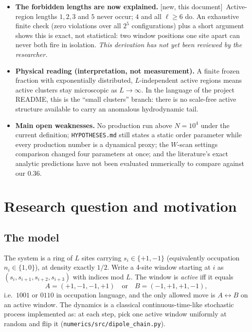 \documentclass[11pt,a4paper]{article}
\newcommand{\NEW}{\textcolor{blue!55!black}{\textsf{\small[new, this document]}}}
\begin{document}
\begin{itemize}
\item \textbf{The forbidden lengths are now explained.} \NEW\ Active-region
lengths $1,2,3$ and $5$ never occur; $4$ and all $\ell\ge6$ do. An
exhaustive finite check (zero violations over all $2^5$ configurations)
plus a short argument shows this is exact, not statistical: two window
positions one site apart can never both fire in isolation. \emph{This
derivation has not yet been reviewed by the researcher.}

\item \textbf{Physical reading (interpretation, not measurement).} A finite
frozen fraction with exponentially distributed, $L$-independent active
regions means active clusters stay microscopic as $L\to\infty$. In the
language of the project README, this is the ``small clusters'' branch:
there is no scale-free active structure available to carry an anomalous
hydrodynamic tail.

\item \textbf{Main open weaknesses.} No production run above $N=10^4$ under
the current definition; \texttt{HYPOTHESES.md} still states a static order
parameter while every production number is a dynamical proxy; the
$W$-scan settings comparison changed four parameters at once; and the
literature's exact analytic predictions have not been evaluated
numerically to compare against our $0.36$.
\end{itemize}

\tableofcontents
\newpage

\section{Research question and motivation}

\subsection{The model}
The system is a ring of $L$ sites carrying $s_i\in\{+1,-1\}$ (equivalently
occupation $n_i\in\{1,0\}$), at density exactly $1/2$. Write a 4-site window
starting at $i$ as $(s_i,s_{i+1},s_{i+2},s_{i+3})$ with indices mod $L$. The
window is \emph{active} iff it equals
\begin{equation}
A=(+1,-1,-1,+1) \quad\text{or}\quad B=(-1,+1,+1,-1),
\end{equation}
i.e.\ $1001$ or $0110$ in occupation language, and the only allowed move is
$A\leftrightarrow B$ on an active window. The dynamics is a classical
continuous-time-like stochastic process implemented as: at each step, pick
one active window uniformly at random and flip it
(\texttt{numerics/src/dipole\_chain.py}).
\end{document}
